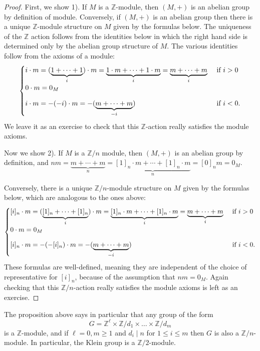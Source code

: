 \documentclass[12pt]{report}
\numberwithin{equation}{section}
\numberwithin{theorem}{chapter}
\theoremstyle{definition}
\newtheorem*{basic properties}{Basic Properties}
\newtheorem*{Important Remark}{Important Remark}
\newcommand{\Z}{\mathbb{Z}}
\begin{document}
\begin{proof}
First, we show 1). If $M$ is a $\Z$-module, then $(M,+)$ is an abelian group by definition of module. Conversely, if $(M,+)$ is an abelian group then there is a unique $\Z$-module structure on $M$ given by the formulas below. The uniqueness of the $\Z$ action follows from the identities below in which the right hand side is determined only by the abelian group structure of $M$. The various identities follow from the axioms of a module:
$$
\begin{cases}
i \cdot m = (\underbrace{1 + \cdots + 1}_i) \cdot m = \underbrace{1   \cdot m + \cdots +1 \cdot m}_i
= \underbrace{ m + \cdots + m}_i & \text{ if } i>0\\
0 \cdot m = 0_M & \vspace{0.8em} \\
i \cdot m = - (-i) \cdot m = - (\underbrace{m + \cdots + m}_{-i}) &  \text{ if } i<0.
\end{cases}
$$
We leave it as an exercise to check that this $\Z$-action really satisfies the module axioms.

Now we show 2). If $M$ is a $\Z/n$ module, then $(M,+)$ is an abelian group by definition, and $nm= \underbrace{ m + \cdots + m}_n=\underbrace{[1]_n   \cdot m + \cdots +[1]_n \cdot m}_n=[0]_nm=0_M$. 

Conversely, there is a unique $\Z/n$-module structure on $M$ given by the formulas below, which are analogous to the ones above:
$$
\begin{cases}
[i]_n \cdot m = (\underbrace{[1]_n+ \cdots + [1]_n}_i) \cdot m = \underbrace{[1]_n   \cdot m + \cdots +[1]_n \cdot m}_i= \underbrace{ m + \cdots + m}_i & \text{ if } i>0\\
0 \cdot m = 0_M & \vspace{0.8em}\\
[i]_n \cdot m = - (-[i]_n) \cdot m = - (\underbrace{m + \cdots + m}_{-i}) &  \text{ if } i<0.
\end{cases}
$$
These formulas are well-defined, meaning they are independent of the choice of representative for $[i]_n$, because of the assumption that $nm=0_M$. Again checking that this $\Z/n$-action really satisfies the module axioms is left as an exercise.
\end{proof}

The proposition above says in particular that any group of the form 
$$G=\Z^\ell\times \Z/d_1\times \dots\times \Z/d_m$$
is a $\Z$-module, and if $\ell=0, m \geqslant 1$ and $d_i \mid n$ for $1 \leqslant i \leqslant m$ then $G$ is also a $\Z/n$-module. In particular, the Klein group is a $\Z/2$-module. 
\end{document}
